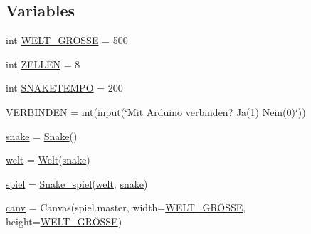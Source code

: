 \subsection*{Variables}
\begin{DoxyCompactItemize}
\item 
int \mbox{\hyperlink{namespace_projekt_01_snake_01auf_01_python_a0bb194ef42a009e15b75b9c78234ec82}{W\+E\+L\+T\+\_\+\+G\+RÖ\+S\+SE}} = 500
\item 
int \mbox{\hyperlink{namespace_projekt_01_snake_01auf_01_python_a0490a870a678eec59b0e01ade54e7cf5}{Z\+E\+L\+L\+EN}} = 8
\item 
int \mbox{\hyperlink{namespace_projekt_01_snake_01auf_01_python_abfd2595e2773b407f4e4d36545e0d6c2}{S\+N\+A\+K\+E\+T\+E\+M\+PO}} = 200
\item 
\mbox{\hyperlink{namespace_projekt_01_snake_01auf_01_python_a494a6a834239a0d8becd8a87a00ec956}{V\+E\+R\+B\+I\+N\+D\+EN}} = int(input(\char`\"{}Mit \mbox{\hyperlink{class_projekt_01_snake_01auf_01_python_1_1_arduino}{Arduino}} verbinden? Ja(1) Nein(0)\char`\"{}))
\item 
\mbox{\hyperlink{namespace_projekt_01_snake_01auf_01_python_aa798779259654cac04213978cf4297ab}{snake}} = \mbox{\hyperlink{class_projekt_01_snake_01auf_01_python_1_1_snake}{Snake}}()
\item 
\mbox{\hyperlink{namespace_projekt_01_snake_01auf_01_python_a80417409ca56d97eabc593c02dbb4a1c}{welt}} = \mbox{\hyperlink{class_projekt_01_snake_01auf_01_python_1_1_welt}{Welt}}(\mbox{\hyperlink{namespace_projekt_01_snake_01auf_01_python_aa798779259654cac04213978cf4297ab}{snake}})
\item 
\mbox{\hyperlink{namespace_projekt_01_snake_01auf_01_python_a21846080f3e252e582ecd7bf21d38f90}{spiel}} = \mbox{\hyperlink{class_projekt_01_snake_01auf_01_python_1_1_snake__spiel}{Snake\+\_\+spiel}}(\mbox{\hyperlink{namespace_projekt_01_snake_01auf_01_python_a80417409ca56d97eabc593c02dbb4a1c}{welt}}, \mbox{\hyperlink{namespace_projekt_01_snake_01auf_01_python_aa798779259654cac04213978cf4297ab}{snake}})
\item 
\mbox{\hyperlink{namespace_projekt_01_snake_01auf_01_python_a9a3afecebf45ad60fdcaa433890500d8}{canv}} = Canvas(spiel.\+master, width=\mbox{\hyperlink{namespace_projekt_01_snake_01auf_01_python_a0bb194ef42a009e15b75b9c78234ec82}{W\+E\+L\+T\+\_\+\+G\+RÖ\+S\+SE}}, height=\mbox{\hyperlink{namespace_projekt_01_snake_01auf_01_python_a0bb194ef42a009e15b75b9c78234ec82}{W\+E\+L\+T\+\_\+\+G\+RÖ\+S\+SE}})
\end{DoxyCompactItemize}


